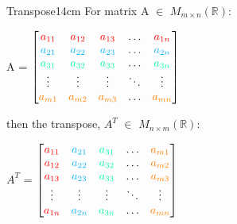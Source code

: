     \begin{definition}{Transpose}{14cm}
        For matrix A $\in$ $M_{m \times n}(\mathbb{R})$:
        
        \hspace{0.5cm}
        A =
        $
        \begin{bmatrix}
            {\color{red} a_{11}} & {\color{red} a_{12}}
                    & {\color{red} a_{13}} & \hdots & {\color{red} a_{1n}} \\
            {\color{lblue} a_{21}} & {\color{lblue} a_{22}}
                    & {\color{lblue} a_{23}} & \hdots & {\color{lblue} a_{2n}} \\
            {\color{green} a_{31}} & {\color{green} a_{32}} 
                    & {\color{green} a_{33}} & \hdots & {\color{green} a_{3n}} \\
            \vdots & \vdots & \vdots & \ddots & \vdots \\
            {\color{orange} a_{m1}} & {\color{orange} a_{m2}} 
                    & {\color{orange} a_{m3}} & \hdots & {\color{orange} a_{mn}} \\
        \end{bmatrix}
        $
        
        then the {\color{lblue} transpose},
        $A^T$ $\in$ $M_{n \times m}(\mathbb{R})$:

        \hspace{0.5cm}
        $A^T$ =
        $
        \begin{bmatrix}
            {\color{red} a_{11}} & {\color{lblue} a_{21}}
                    & {\color{green} a_{31}} & \hdots & {\color{orange} a_{m1}} \\
            {\color{red} a_{12}} & {\color{lblue} a_{22}}
                    & {\color{green} a_{32}} & \hdots & {\color{orange} a_{m2}} \\
            {\color{red} a_{13}} & {\color{lblue} a_{23}}
                    & {\color{green} a_{33}} & \hdots & {\color{orange} a_{m3}} \\
            \vdots & \vdots & \vdots & \ddots & \vdots \\
            {\color{red} a_{1n}} & {\color{lblue} a_{2n}}
                    & {\color{green} a_{3n}} & \hdots & {\color{orange} a_{mn}} \\
        \end{bmatrix}
        $
    \end{definition}

    \newpage



